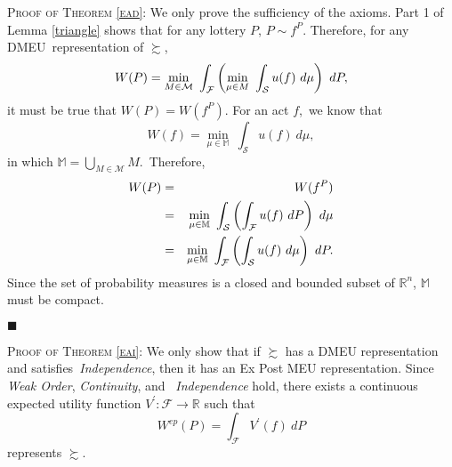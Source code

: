 \documentclass[12pt, notitlepage]{article}
\begin{document}
{\textsc{Proof of Theorem \ref{ead}}: We only prove the sufficiency of the
axioms. Part 1 of Lemma \ref{triangle} shows that for any lottery $P$, $%
P\sim f^{P}$. Therefore, for any }DMEU{\ representation of $\succsim $,%
\begin{equation*}
W(P)=\min_{M\in \mathcal{M}}~\int_{\mathcal{F}}\left( \underset{\mu \in M}{%
\min }~\int_{\mathcal{S}}u(f)~d\mu \right) ~dP,
\end{equation*}%
it must be true that $W(P)=W(f^{P})$. For an act }$f$,{\ we know that%
\begin{equation*}
W(f)=\underset{\mu \in \mathbb{M}}{\min }~\int_{\mathcal{S}}u(f)~d\mu ,
\end{equation*}%
in which }$\mathbb{M}=\bigcup_{M\in \mathcal{M}}M$.{\ Therefore,%
\begin{eqnarray*}
W(P) &=&W(f^{P}) \\
&=&\underset{\mu \in \mathbb{M}}{\min }~\int_{\mathcal{S}}\left( \int_{%
\mathcal{F}}u(f)~dP\right) ~d\mu \\
&=&\underset{\mu \in \mathbb{M}}{\min }~\int_{\mathcal{F}}\left( \int_{%
\mathcal{S}}u(f)~d\mu \right) ~dP.
\end{eqnarray*}%
}Since the set of probability measures is a closed and bounded subset of $%
\mathbb{R}^{n}$, $\mathbb{M}$ must be compact.

\begin{flushleft}
{$\blacksquare $\linebreak }
\end{flushleft}

{\textsc{Proof of Theorem \ref{eai}}: We only show that if $\succsim $ has a
DMEU representation and satisfies\textit{\ Independence}, then it has an Ex
Post MEU representation. Since \textit{Weak Order}, \textit{Continuity}, and%
\textit{\ Independence} hold, there exists a continuous expected utility
function $V^{\prime }:\mathcal{F}\rightarrow \mathbb{R}$ such that%
\begin{equation*}
W^{ep}(P)=\int_{\mathcal{F}}V^{\prime }(f)~dP
\end{equation*}%
represents $\succsim $.}
\end{document}
